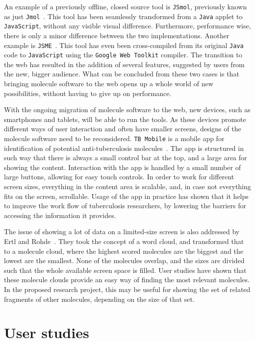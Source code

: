 An example of a previously offline, closed source tool is \verb|JSmol|, previously known as just \verb|Jmol|~\cite{hanson2013jsmol}. This tool has been seamlessly transformed from a \verb|Java| applet to \verb|JavaScript|, without any visible visual difference. Furthermore, performance wise, there is only a minor difference between the two implementations. Another example is \verb|JSME|~\cite{bienfait2013jsme}. This tool has even been cross-compiled from its original \verb|Java| code to \verb|JavaScript| using the \verb|Google Web Toolkit| compiler. The transition to the web has resulted in the addition of several features, suggested by users from the new, bigger audience. What can be concluded from these two cases is that bringing molecule software to the web opens up a whole world of new possibilities, without having to give up on performance.

With the ongoing migration of molecule software to the web, new devices, such as smartphones and tablets, will be able to run the tools. As these devices promote different ways of user interaction and often have smaller screens, designs of the molecule software need to be reconsidered. \verb|TB Mobile| is a mobile app for identification of potential anti-tuberculosis molecules~\cite{ekins2013tb}. The app is structured in such way that there is always a small control bar at the top, and a large area for showing the content. Interaction with the app is handled by a small number of large buttons, allowing for easy touch controls. In order to work for different screen sizes, everything in the content area is scalable, and, in case not everything fits on the screen, scrollable. Usage of the app in practice has shown that it helps to improve the work flow of tuberculosis researchers, by lowering the barriers for accessing the information it provides.

The issue of showing a lot of data on a limited-size screen is also addressed by Ertl and Rohde~\cite{ertl2012molecule}. They took the concept of a word cloud, and transformed that to a molecule cloud, where the highest scored molecules are the biggest and the lowest are the smallest. None of the molecules overlap, and the sizes are divided such that the whole available screen space is filled. User studies have shown that these molecule clouds provide an easy way of finding the most relevant molecules. In the proposed research project, this may be useful for showing the set of related fragments of other molecules, depending on the size of that set.


\section{User studies}

